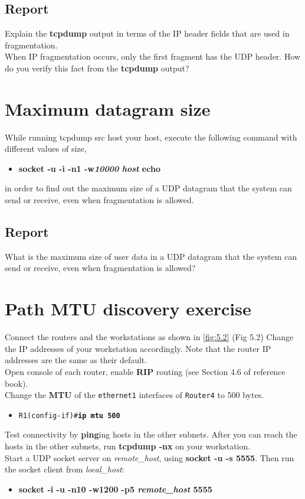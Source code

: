 \documentclass[10pt,a4paper]{article}
\numberwithin{equation}{section}
\numberwithin{figure}{section}
\numberwithin{table}{section}
\begin{document}
	\subsection*{Report}
	Explain the \textbf{tcpdump} output in terms of the IP header fields that are used in fragmentation. \\
	When IP fragmentation occurs, only the first fragment has the UDP header.
	How do you verify this fact from the \textbf{tcpdump} output?


\section{Maximum datagram size}
\label{sec:MaxDatagramSize}
	While running tcpdump src host your host, execute the following command with different values of size,
	\begin{itemize}
		\item \textbf{socket -u -i -n1 -w\textit{10000} \textit{host} echo}
	\end{itemize}
	in order to find out the maximum size of a UDP datagram that the system can send or receive, even when fragmentation is allowed.

\subsection*{Report}
	What is the maximum size of user data in a UDP datagram that the system can send or receive, even when fragmentation is allowed?


\section*{Path MTU discovery exercise}
	Connect the routers and the workstations as shown in \autoref{fig:5.2} (Fig 5.2) Change the IP
	addresses of your workstation accordingly. Note that the router IP addresses are
	the same as their default.\\
	Open console of  each router, enable \textbf{RIP} routing (see Section 4.6 of reference book).\\
	Change the \textbf{MTU} of the \texttt{ethernet1} interfaces of \texttt{Router4} to 500
	bytes.
	\begin{itemize}
		\item \texttt{R1(config-if)\#\textbf{ip mtu 500}}
	\end{itemize}
	Test connectivity by \textbf{ping}ing hosts in the other subnets. After you can reach the
	hosts in the other subnets, run \textbf{tcpdump -nx} on your workstation.\\
	Start a UDP socket server on \textit{remote\_host}, using \textbf{socket -u -s 5555}.
	Then run the socket client from \textit{local\_host}:
	\begin{itemize}
		\item \textbf{socket -i -u -n10 -w1200 -p5 \textit{remote\_host} 5555}
	\end{itemize}
\end{document}
